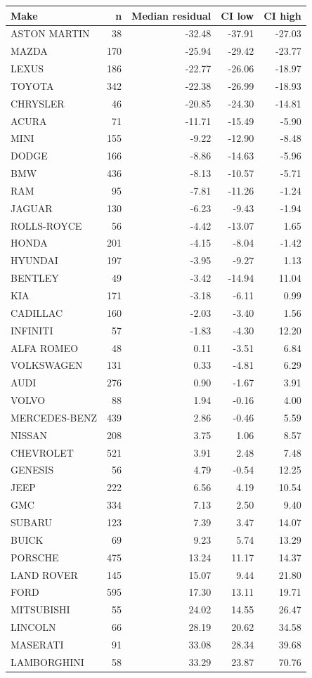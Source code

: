 \begin{tabular}{lrrrr}
\toprule
Make & n & Median residual & CI low & CI high \\
\midrule
ASTON MARTIN & 38 & -32.48 & -37.91 & -27.03 \\
MAZDA & 170 & -25.94 & -29.42 & -23.77 \\
LEXUS & 186 & -22.77 & -26.06 & -18.97 \\
TOYOTA & 342 & -22.38 & -26.99 & -18.93 \\
CHRYSLER & 46 & -20.85 & -24.30 & -14.81 \\
ACURA & 71 & -11.71 & -15.49 & -5.90 \\
MINI & 155 & -9.22 & -12.90 & -8.48 \\
DODGE & 166 & -8.86 & -14.63 & -5.96 \\
BMW & 436 & -8.13 & -10.57 & -5.71 \\
RAM & 95 & -7.81 & -11.26 & -1.24 \\
JAGUAR & 130 & -6.23 & -9.43 & -1.94 \\
ROLLS-ROYCE & 56 & -4.42 & -13.07 & 1.65 \\
HONDA & 201 & -4.15 & -8.04 & -1.42 \\
HYUNDAI & 197 & -3.95 & -9.27 & 1.13 \\
BENTLEY & 49 & -3.42 & -14.94 & 11.04 \\
KIA & 171 & -3.18 & -6.11 & 0.99 \\
CADILLAC & 160 & -2.03 & -3.40 & 1.56 \\
INFINITI & 57 & -1.83 & -4.30 & 12.20 \\
ALFA ROMEO & 48 & 0.11 & -3.51 & 6.84 \\
VOLKSWAGEN & 131 & 0.33 & -4.81 & 6.29 \\
AUDI & 276 & 0.90 & -1.67 & 3.91 \\
VOLVO & 88 & 1.94 & -0.16 & 4.00 \\
MERCEDES-BENZ & 439 & 2.86 & -0.46 & 5.59 \\
NISSAN & 208 & 3.75 & 1.06 & 8.57 \\
CHEVROLET & 521 & 3.91 & 2.48 & 7.48 \\
GENESIS & 56 & 4.79 & -0.54 & 12.25 \\
JEEP & 222 & 6.56 & 4.19 & 10.54 \\
GMC & 334 & 7.13 & 2.50 & 9.40 \\
SUBARU & 123 & 7.39 & 3.47 & 14.07 \\
BUICK & 69 & 9.23 & 5.74 & 13.29 \\
PORSCHE & 475 & 13.24 & 11.17 & 14.37 \\
LAND ROVER & 145 & 15.07 & 9.44 & 21.80 \\
FORD & 595 & 17.30 & 13.11 & 19.71 \\
MITSUBISHI & 55 & 24.02 & 14.55 & 26.47 \\
LINCOLN & 66 & 28.19 & 20.62 & 34.58 \\
MASERATI & 91 & 33.08 & 28.34 & 39.68 \\
LAMBORGHINI & 58 & 33.29 & 23.87 & 70.76 \\
\bottomrule
\end{tabular}
